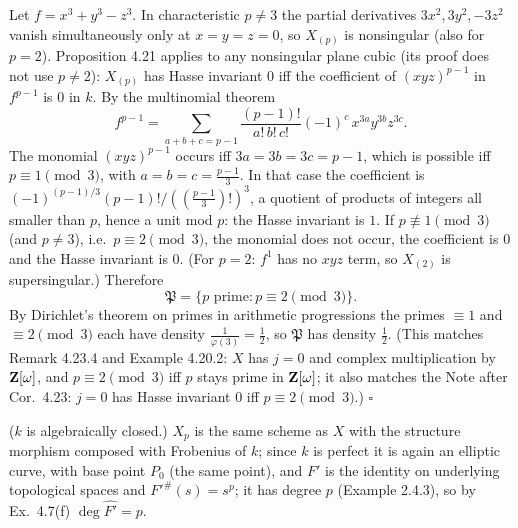 \documentclass[11pt]{article}
\begin{document}
\pf
Let $f=x^3+y^3-z^3$. In characteristic $p\ne3$ the partial derivatives $3x^2,3y^2,-3z^2$ vanish simultaneously only at $x=y=z=0$, so $X_{(p)}$ is nonsingular (also for $p=2$). Proposition 4.21 applies to any nonsingular plane cubic (its proof does not use $p\ne2$): $X_{(p)}$ has Hasse invariant $0$ iff the coefficient of $(xyz)^{p-1}$ in $f^{p-1}$ is $0$ in $k$. By the multinomial theorem
\[
f^{p-1}=\sum_{a+b+c=p-1}\frac{(p-1)!}{a!\,b!\,c!}(-1)^c\,x^{3a}y^{3b}z^{3c}.
\]
The monomial $(xyz)^{p-1}$ occurs iff $3a=3b=3c=p-1$, which is possible iff $p\equiv1\pmod3$, with $a=b=c=\frac{p-1}3$. In that case the coefficient is $(-1)^{(p-1)/3}(p-1)!/((\frac{p-1}3)!)^3$, a quotient of products of integers all smaller than $p$, hence a unit mod $p$: the Hasse invariant is $1$. If $p\not\equiv1\pmod 3$ (and $p\ne3$), i.e.\ $p\equiv2\pmod3$, the monomial does not occur, the coefficient is $0$ and the Hasse invariant is $0$. (For $p=2$: $f^1$ has no $xyz$ term, so $X_{(2)}$ is supersingular.) Therefore
\[
\mathfrak P=\{p\text{ prime}:p\equiv2\pmod3\}.
\]
By Dirichlet's theorem on primes in arithmetic progressions the primes $\equiv1$ and $\equiv2\pmod3$ each have density $\frac1{\varphi(3)}=\frac12$, so $\mathfrak P$ has density $\frac12$. (This matches Remark 4.23.4 and Example 4.20.2: $X$ has $j=0$ and complex multiplication by $\mathbf Z[\omega]$, and $p\equiv2\pmod3$ iff $p$ stays prime in $\mathbf Z[\omega]$; it also matches the Note after Cor.~4.23: $j=0$ has Hasse invariant $0$ iff $p\equiv2\pmod3$.) \hfill$\square$

\pf
($k$ is algebraically closed.) $X_p$ is the same scheme as $X$ with the structure morphism composed with Frobenius of $k$; since $k$ is perfect it is again an elliptic curve, with base point $P_0$ (the same point), and $F'$ is the identity on underlying topological spaces and $F'^\#(s)=s^p$; it has degree $p$ (Example 2.4.3), so by Ex.~4.7(f) $\deg\widehat{F'}=p$.
\end{document}
